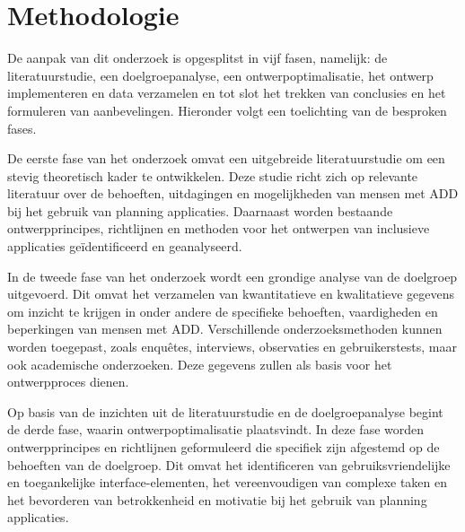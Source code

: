 
\section{Methodologie}%
\label{sec:methodologie}

De aanpak van dit onderzoek is opgesplitst in vijf fasen, namelijk: de literatuurstudie, een doelgroepanalyse, een ontwerpoptimalisatie, het ontwerp implementeren en data verzamelen en tot slot het trekken van conclusies en het formuleren van aanbevelingen. Hieronder volgt een toelichting van de besproken fases. \newline 


De eerste fase van het onderzoek omvat een uitgebreide literatuurstudie om een stevig theoretisch kader te ontwikkelen. Deze studie richt zich op relevante literatuur over de behoeften, uitdagingen en mogelijkheden van mensen met ADD bij het gebruik van planning applicaties. Daarnaast worden bestaande ontwerpprincipes, richtlijnen en methoden voor het ontwerpen van inclusieve applicaties geïdentificeerd en geanalyseerd. \newline 

In de tweede fase van het onderzoek wordt een grondige analyse van de doelgroep uitgevoerd. Dit omvat het verzamelen van kwantitatieve en kwalitatieve gegevens om inzicht te krijgen in onder andere de specifieke behoeften, vaardigheden en beperkingen van mensen met ADD. Verschillende onderzoeksmethoden kunnen worden toegepast, zoals enquêtes, interviews, observaties en gebruikerstests, maar ook academische onderzoeken. Deze gegevens zullen als basis voor het ontwerpproces dienen. \newline 

Op basis van de inzichten uit de literatuurstudie en de doelgroepanalyse begint de derde fase, waarin ontwerpoptimalisatie plaatsvindt. In deze fase worden ontwerpprincipes en richtlijnen geformuleerd die specifiek zijn afgestemd op de behoeften van de doelgroep. Dit omvat het identificeren van gebruiksvriendelijke en toegankelijke interface-elementen, het vereenvoudigen van complexe taken en het bevorderen van betrokkenheid en motivatie bij het gebruik van planning applicaties. \newline 

